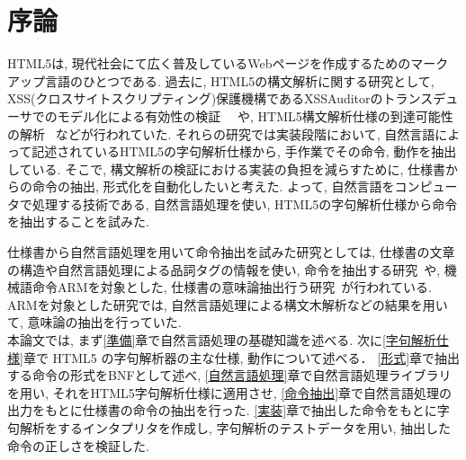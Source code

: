 \documentclass[uplatex,a4j]{jsreport}
\begin{document}
\chapter{序論}

HTML5は, 現代社会にて広く普及しているWebページを作成するためのマークアップ言語のひとつである.
過去に, HTML5の構文解析に関する研究として, 
XSS(クロスサイトスクリプティング)保護機構であるXSSAuditorのトランスデューサでのモデル化による有効性の検証~\cite{XSSAuditor} ~\cite{トランスデューサの包含関係}や, 
HTML5構文解析仕様の到達可能性の解析 ~\cite{HTML5Testing}などが行われていた. 
それらの研究では実装段階において, 自然言語によって記述されているHTML5の字句解析仕様から, 手作業でその命令, 動作を抽出している. 
そこで, 構文解析の検証における実装の負担を減らすために, 仕様書からの命令の抽出,  形式化を自動化したいと考えた. 
よって, 自然言語をコンピュータで処理する技術である, 自然言語処理を使い, HTML5の字句解析仕様から命令を抽出することを試みた.

仕様書から自然言語処理を用いて命令抽出を試みた研究としては, 
仕様書の文章の構造や自然言語処理による品詞タグの情報を使い, 命令を抽出する研究~\cite{7272551}や, 
機械語命令ARMを対象とした, 仕様書の意味論抽出行う研究~\cite{arm}が行われている. 
ARMを対象とした研究では, 自然言語処理による構文木解析などの結果を用いて, 意味論の抽出を行っていた.\\


本論文では, まず\ref{準備}章で自然言語処理の基礎知識を述べる.
次に\ref{字句解析仕様}章で HTML5 の字句解析器の主な仕様, 動作について述べる．
\ref{形式}章で抽出する命令の形式をBNFとして述べ, 
\ref{自然言語処理}章で自然言語処理ライブラリを用い, それをHTML5字句解析仕様に適用させ, 
\ref{命令抽出}章で自然言語処理の出力をもとに仕様書の命令の抽出を行った. 
\ref{実装}章で抽出した命令をもとに字句解析をするインタプリタを作成し, 
字句解析のテストデータを用い, 抽出した命令の正しさを検証した.
\end{document}
